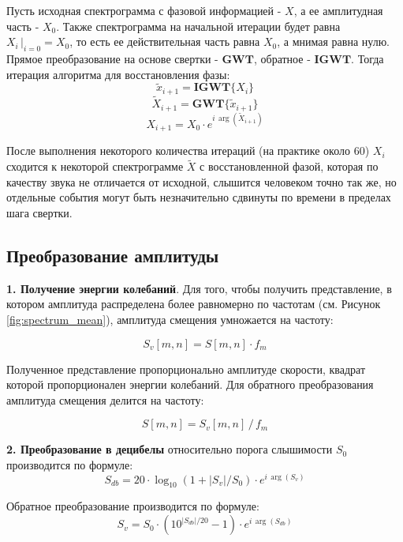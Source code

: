 Пусть исходная спектрограмма с фазовой информацией - $X$, а ее амплитудная часть - $X_0$. 
Также спектрограмма на начальной итерации будет равна $X_i \, |_{i=0} = X_0$, то есть ее действительная часть равна $X_0$, а мнимая равна нулю.
Прямое преобразование на основе свертки - $\textbf{GWT}$, обратное - $\textbf{IGWT}$.
Тогда итерация алгоритма для восстановления фазы:
\begin{equation}
  \tilde{x}_{i+1} = \textbf{IGWT}\{X_{i}\}
\end{equation}
\[\tilde{X}_{i+1} = \textbf{GWT}\{\tilde{x}_{i+1}\}\]
\[X_{i+1} = X_0 \cdot e^{i\, \arg(\tilde{X}_{i+1})}\]

После выполнения некоторого количества итераций (на практике около 60) $X_{i}$ сходится к некоторой спектрограмме 
$\tilde{X}$ с восстановленной фазой, которая по качеству звука не отличается от исходной, слышится человеком точно так же, но отдельные события могут быть незначительно сдвинуты по времени в пределах шага свертки.


\subsection{Преобразование амплитуды}

\textbf{1. Получение энергии колебаний}. Для того, чтобы получить представление, 
в котором амплитуда распределена более равномерно по частотам (см. Рисунок \ref{fig:spectrum_mean}),
амплитуда смещения умножается на частоту: 

\begin{equation}
  S_v[m,n] = S[m,n] \cdot f_m
\end{equation}

Полученное представление пропорционально амплитуде скорости, 
квадрат которой пропорционален энергии колебаний.
Для обратного преобразования амплитуда смещения делится на частоту: 

\begin{equation}
  S[m,n] = S_v[m,n]\,/\,f_m
\end{equation}

\textbf{2. Преобразование в децибелы} относительно порога слышимости $S_0$ производится по формуле:
\begin{equation}
  S_{db} = 20 \cdot \log_{10}(1 + |S_v| / S_0) \cdot e^{i\, \arg(S_v)}
\end{equation}

Обратное преобразование производится по формуле:
\begin{equation}
  S_v = S_0 \cdot (10^{|S_{db}|/20} - 1) \cdot e^{i\, \arg(S_{db})}
\end{equation}


